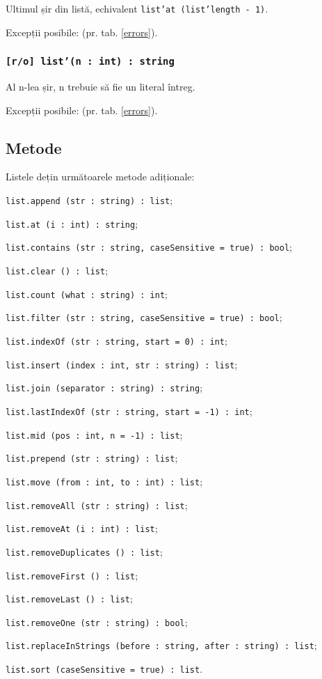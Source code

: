 Ultimul șir din listă, echivalent \texttt{list'at (list'length - 1)}.

Excepții posibile:  (pr. tab. \ref{errors}).

\subsubsection{\texttt{[r/o] list'(n : int) : string}}

Al n-lea șir, n trebuie să fie un literal întreg.

Excepții posibile:  (pr. tab. \ref{errors}).

\subsection{Metode}

Listele dețin următoarele metode adiționale:
\begin{icItems}
\item \texttt{list.append (str : string) : list};
\item \texttt{list.at (i : int) : string};
\item \texttt{list.contains (str : string, caseSensitive = true) : bool};
\item \texttt{list.clear () : list};
\item \texttt{list.count (what : string) : int};
\item \texttt{list.filter (str : string, caseSensitive = true) : bool};
\item \texttt{list.indexOf (str : string, start = 0) : int};
\item \texttt{list.insert (index : int, str : string) : list};
\item \texttt{list.join (separator : string) : string};
\item \texttt{list.lastIndexOf (str : string, start = -1) : int};
\item \texttt{list.mid (pos : int, n = -1) : list};
\item \texttt{list.prepend (str : string) : list};
\item \texttt{list.move (from : int, to : int) : list};
\item \texttt{list.removeAll (str : string) : list};
\item \texttt{list.removeAt (i : int) : list};
\item \texttt{list.removeDuplicates () : list};
\item \texttt{list.removeFirst () : list};
\item \texttt{list.removeLast () : list};
\item \texttt{list.removeOne (str : string) : bool};
\item \texttt{list.replaceInStrings (before : string, after : string) : list};
\item \texttt{list.sort (caseSensitive = true) : list}.
\end{icItems}

